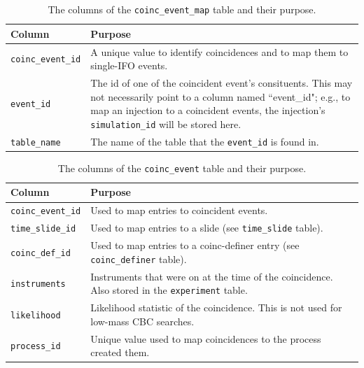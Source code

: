 \begin{table}[p]
\label{tab:coinc_event_map}
\center
\begin{tabular}{l | p{10cm}}
Column      &   Purpose     \\
\hline \hline
\texttt{coinc\_event\_id}   &   A unique value to identify coincidences and to map them to single-\ac{IFO} events. \\
\hline
\texttt{event\_id}  & The id of one of the coincident event's consituents. This may not necessarily point to a column named ``event\_id"; e.g., to map an injection to a coincident events, the injection's \texttt{simulation\_id} will be stored here. \\
\hline
\texttt{table\_name}    &   The name of the table that the \texttt{event\_id} is found in.
\end{tabular}
\caption{The columns of the \texttt{coinc\_event\_map} table and their purpose.}
\end{table}

\begin{table}[p]
\label{tab:coinc_event}
\center
\begin{tabular}{l | p{10cm}}
Column      &   Purpose     \\
\hline \hline
\texttt{coinc\_event\_id}   &   Used to map entries to coincident events. \\
\hline
\texttt{time\_slide\_id}    &   Used to map entries to a slide (see \texttt{time\_slide} table). \\
\hline
\texttt{coinc\_def\_id}     &   Used to map entries to a coinc-definer entry (see \texttt{coinc\_definer} table). \\
\hline
\texttt{instruments}        &   Instruments that were on at the time of the coincidence. Also stored in the \texttt{experiment} table. \\
\hline
\texttt{likelihood}         &   Likelihood statistic of the coincidence. This is not used for low-mass \ac{CBC} searches. \\
\hline
\texttt{process\_id}        &   Unique value used to map coincidences to the process created them.
\end{tabular}
\caption{The columns of the \texttt{coinc\_event} table and their purpose.}
\end{table}

